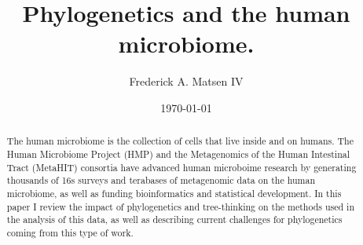 \documentclass{amsart}
\newcommand{\forarxiv}[1]{#1}
\newcommand{\notforarxiv}[1]{}
\begin{document}
\notforarxiv{
\begin{flushright}
Version dated: \today
\end{flushright}
\bigskip
\noindent RH: PHYLOGENETICS AND THE HUMAN MICROBIOME
\bigskip
\medskip
\begin{center}

\noindent{\Large \bf Phylogenetics and the human microbiome.}
\bigskip

\noindent {\normalsize \sc
Frederick A. Matsen IV$^1$}\\
\noindent {\small \it
$^1$
Program in Computational Biology, Fred Hutchinson Cancer Research Center, Seattle, WA, 91802, USA}\\
\end{center}
\medskip
\noindent{\bf Corresponding author:} Frederick A Matsen, Program in Computational Biology, Fred Hutchinson Cancer Research Center, Seattle, WA, 91802, USA; E-mail: matsen@fhcrc.org.\\
\vspace{1in}
}

\forarxiv{\
\title{Phylogenetics and the human microbiome.}
\author{Frederick A. Matsen IV}
\date{\today}
\begin{abstract}
}
\notforarxiv{
\subsubsection{Abstract}
}

The human microbiome is the collection of cells that live inside and on humans.
The Human Microbiome Project (HMP) and the Metagenomics of the Human Intestinal Tract (MetaHIT) consortia have advanced human microboime research by generating thousands of 16s surveys and terabases of metagenomic data on the human microbiome, as well as funding bioinformatics and statistical development.
In this paper I review the impact of phylogenetics and tree-thinking on the methods used in the analysis of this data, as well as describing current challenges for phylogenetics coming from this type of work.

\forarxiv{
\end{abstract}
\maketitle
}

\notforarxiv{
\noindent (Keywords: human microbiome; microbial ecology; phylogenetic methods; review)\\
\vspace{1.5in}
}
\end{document}
